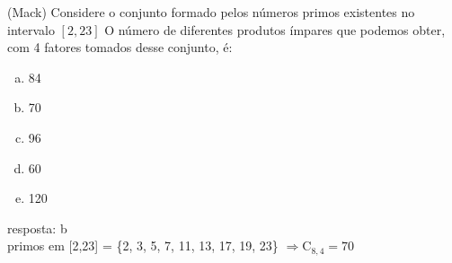 \begin{ex}
  (Mack) Considere o conjunto formado pelos números primos existentes no intervalo $[2,23]$ O número de diferentes produtos ímpares que podemos obter, com 4 fatores tomados desse conjunto, é: 
   \begin{enumerate} [(a)]
       \item 84
       \item 70
       \item 96
       \item 60
       \item 120
   \end{enumerate}
    \begin{sol}
    resposta: b \\
    primos em [2,23] = \{2, 3, 5, 7, 11, 13, 17, 19, 23\} $\Longrightarrow \mathrm{C}_{8,4}=70$
    
    \end{sol}
 \end{ex}